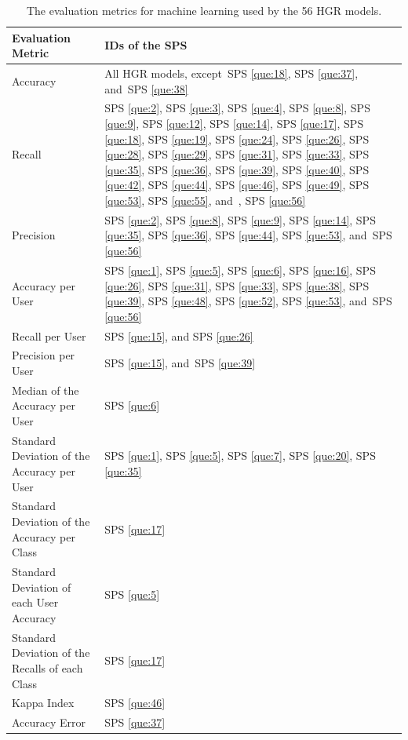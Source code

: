 \documentclass[sensors,review,accept,moreauthors,pdftex]{Definitions/mdpi}
\begin{document}
\begin{table}[H]
	\caption{The evaluation metrics for machine learning used by the 56 HGR models.}
	\label{tab:14}
	\centering
	\setlength{\tabcolsep}{3pt}
	\begin{tabular}{p{210pt}p{200pt}}
		\toprule
		\textbf{Evaluation Metric}&\textbf{IDs of the SPS}\\
		
		
		\midrule
		
		 Accuracy & All HGR models, except~SPS \ref{que:18}, SPS \ref{que:37}, and~SPS \ref{que:38}  \\
		\midrule
		Recall & SPS \ref{que:2}, SPS \ref{que:3}, SPS \ref{que:4}, SPS \ref{que:8}, SPS \ref{que:9}, SPS \ref{que:12}, SPS \ref{que:14}, SPS \ref{que:17}, SPS \ref{que:18}, SPS \ref{que:19}, SPS \ref{que:24}, SPS \ref{que:26}, SPS \ref{que:28}, SPS \ref{que:29}, SPS \ref{que:31}, SPS \ref{que:33}, SPS \ref{que:35}, SPS \ref{que:36}, SPS \ref{que:39}, SPS \ref{que:40}, SPS \ref{que:42}, SPS \ref{que:44}, SPS \ref{que:46}, SPS \ref{que:49}, SPS \ref{que:53}, SPS \ref{que:55}, and~, SPS \ref{que:56}\\
		\midrule
		Precision & SPS \ref{que:2}, SPS \ref{que:8}, SPS \ref{que:9}, SPS \ref{que:14}, SPS \ref{que:35}, SPS \ref{que:36}, SPS \ref{que:44}, SPS \ref{que:53}, and~SPS \ref{que:56}\\
		\midrule
		 Accuracy per User & SPS \ref{que:1}, SPS \ref{que:5}, SPS \ref{que:6}, SPS \ref{que:16}, SPS \ref{que:26}, SPS \ref{que:31}, SPS \ref{que:33}, SPS \ref{que:38}, SPS \ref{que:39}, SPS \ref{que:48}, SPS \ref{que:52}, SPS \ref{que:53}, and~SPS \ref{que:56}\\
		\midrule
		Recall per User & SPS \ref{que:15}, and SPS \ref{que:26}\\
		\midrule
		Precision per User & SPS \ref{que:15}, and~SPS \ref{que:39}\\
		\midrule
		Median of the Accuracy per User & SPS \ref{que:6}\\
		\midrule
		Standard Deviation of the Accuracy per User & SPS \ref{que:1}, SPS \ref{que:5}, SPS \ref{que:7}, SPS \ref{que:20}, SPS \ref{que:35}\\
		\midrule
		Standard Deviation of the Accuracy per Class & SPS \ref{que:17} \\
		\midrule
		Standard Deviation of each User Accuracy & SPS \ref{que:5} \\
		\midrule
		Standard Deviation of the Recalls of each Class & SPS \ref{que:17}\\
		\midrule
		Kappa Index & SPS \ref{que:46}\\
		
		\midrule
		Accuracy Error &  SPS \ref{que:37} \\
		\bottomrule
		
	\end{tabular}
	
\end{table}
\end{document}
